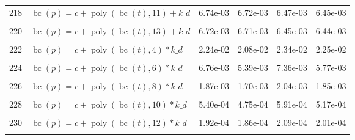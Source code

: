 \documentclass[12pt,a4paper]{article}
\DeclareMathOperator{\bc}{bc}
\DeclareMathOperator{\poly}{poly}
\begin{document}
\begin{longtable}[t]{ll>{\raggedleft\arraybackslash}p{2cm}>{\raggedleft\arraybackslash}p{2cm}>{\raggedleft\arraybackslash}p{2cm}>{\raggedleft\arraybackslash}p{2cm}}
218 & $\bc(p) = c + \poly\left( \bc(t), 11 \right) + k\_d$ & 6.74e-03 & 6.72e-03 & 6.47e-03 & 6.45e-03\\
\cellcolor{gray!6}{219} & \cellcolor{gray!6}{$\bc(p) = c + \poly\left( \bc(t), 12 \right) + k\_d$} & \cellcolor{gray!6}{6.72e-03} & \cellcolor{gray!6}{6.71e-03} & \cellcolor{gray!6}{6.45e-03} & \cellcolor{gray!6}{6.44e-03}\\
220 & $\bc(p) = c + \poly\left( \bc(t), 13 \right) + k\_d$ & 6.72e-03 & 6.71e-03 & 6.45e-03 & 6.44e-03\\
\cellcolor{gray!6}{221} & \cellcolor{gray!6}{$\bc(p) = c + \poly\left( \bc(t), 3 \right) * k\_d$} & \cellcolor{gray!6}{5.39e-02} & \cellcolor{gray!6}{1.71e-02} & \cellcolor{gray!6}{1.90e-02} & \cellcolor{gray!6}{1.78e-02}\\
222 & $\bc(p) = c + \poly\left( \bc(t), 4 \right) * k\_d$ & 2.24e-02 & 2.08e-02 & 2.34e-02 & 2.25e-02\\
\cellcolor{gray!6}{223} & \cellcolor{gray!6}{$\bc(p) = c + \poly\left( \bc(t), 5 \right) * k\_d$} & \cellcolor{gray!6}{8.81e-03} & \cellcolor{gray!6}{8.81e-03} & \cellcolor{gray!6}{8.43e-03} & \cellcolor{gray!6}{8.43e-03}\\
224 & $\bc(p) = c + \poly\left( \bc(t), 6 \right) * k\_d$ & 6.76e-03 & 5.39e-03 & 7.36e-03 & 5.77e-03\\
\cellcolor{gray!6}{225} & \cellcolor{gray!6}{$\bc(p) = c + \poly\left( \bc(t), 7 \right) * k\_d$} & \cellcolor{gray!6}{2.14e-03} & \cellcolor{gray!6}{2.01e-03} & \cellcolor{gray!6}{2.23e-03} & \cellcolor{gray!6}{2.09e-03}\\
226 & $\bc(p) = c + \poly\left( \bc(t), 8 \right) * k\_d$ & 1.87e-03 & 1.70e-03 & 2.04e-03 & 1.85e-03\\
\cellcolor{gray!6}{227} & \cellcolor{gray!6}{$\bc(p) = c + \poly\left( \bc(t), 9 \right) * k\_d$} & \cellcolor{gray!6}{5.81e-04} & \cellcolor{gray!6}{5.65e-04} & \cellcolor{gray!6}{5.89e-04} & \cellcolor{gray!6}{5.69e-04}\\
228 & $\bc(p) = c + \poly\left( \bc(t), 10 \right) * k\_d$ & 5.40e-04 & 4.75e-04 & 5.91e-04 & 5.17e-04\\
\cellcolor{gray!6}{229} & \cellcolor{gray!6}{$\bc(p) = c + \poly\left( \bc(t), 11 \right) * k\_d$} & \cellcolor{gray!6}{1.93e-04} & \cellcolor{gray!6}{1.91e-04} & \cellcolor{gray!6}{2.06e-04} & \cellcolor{gray!6}{2.03e-04}\\
230 & $\bc(p) = c + \poly\left( \bc(t), 12 \right) * k\_d$ & 1.92e-04 & 1.86e-04 & 2.09e-04 & 2.01e-04\\
\cellcolor{gray!6}{231} & \cellcolor{gray!6}{$\bc(p) = c + \poly\left( \bc(t), 13 \right) * k\_d$} & \cellcolor{gray!6}{1.40e-04} & \cellcolor{gray!6}{1.40e-04} & \cellcolor{gray!6}{1.48e-04} & \cellcolor{gray!6}{1.48e-04}\\*
\end{longtable}
\endgroup{}
\end{document}
